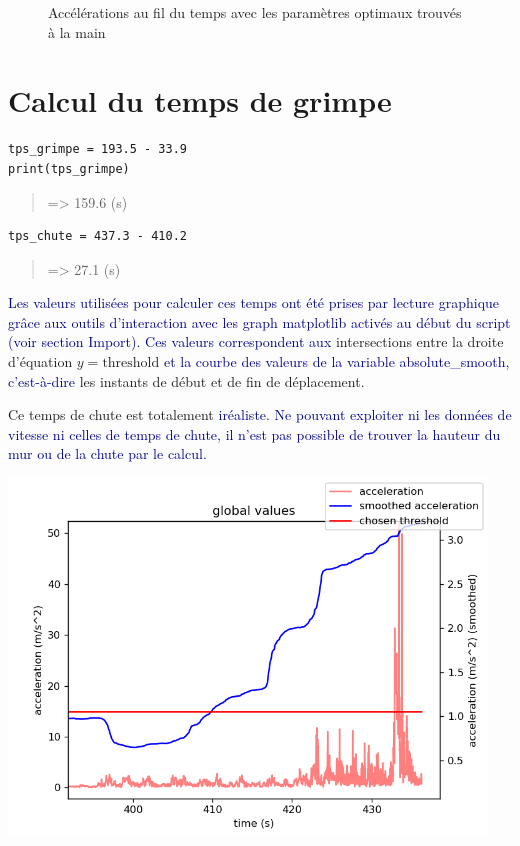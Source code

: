 \documentclass[11pt]{article}
\begin{document}
\begin{figure}[htbp]
\centering

\caption{Accélérations au fil du temps avec les paramètres optimaux trouvés à la main}
\end{figure}

\begin{center}

\end{center}
\section{Calcul du temps de grimpe}
\label{sec:org2083c25}

\begin{verbatim}
tps_grimpe = 193.5 - 33.9
print(tps_grimpe)
\end{verbatim}

\begin{quote}
=> 159.6 (s)
\end{quote}

\begin{verbatim}
tps_chute = 437.3 - 410.2
\end{verbatim}

\begin{quote}
=> 27.1 (s)
\end{quote}

\textcolor{darkblue}{Les valeurs utilisées pour calculer ces temps ont été prises par lecture graphique grâce aux outils d'interaction avec les graph matplotlib activés au début du script (voir section Import). Ces valeurs correspondent aux} intersections entre la droite d'équation \(y = \text{threshold}\)
\textcolor{darkblue}{et la courbe des valeurs de la variable absolute\_smooth, c'est-à-dire} les instants de début et de fin de déplacement.

Ce temps de chute est totalement \textcolor{darkblue}{iréaliste. Ne pouvant exploiter ni les données de vitesse ni celles de temps de chute, il n'est pas possible de trouver la hauteur du mur ou de la chute par le calcul.}

\begin{center}
\includegraphics[width=5in]{fig4.png}
\end{center}
\end{document}

